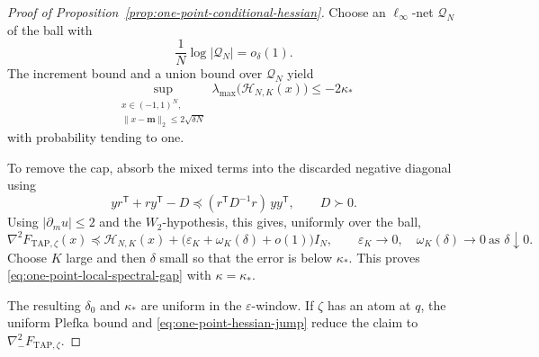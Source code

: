 \documentclass[a4paper,10pt,reqno]{amsart}
\numberwithin{equation}{section}
\newcommand{\ve}{\varepsilon}
\newcommand{\TAP}{\mathrm{TAP}}
\newcommand{\bfm}{\mathbf{m}}
\begin{document}
\begin{proof}[Proof of Proposition~\ref{prop:one-point-conditional-hessian}]
		Choose an \(\ell_\infty\)-net \(\mathcal Q_N\) of the ball with
		\[
		\frac1N\log|\mathcal Q_N|=o_\delta(1).
		\]
		The increment bound and a union bound over \(\mathcal Q_N\) yield
		\[
		\sup_{\substack{
				x\in(-1,1)^N,\\
				\|x-\bfm\|_2\le2\sqrt{\delta N}
		}}
		\lambda_{\max}\bigl(\mathcal H_{N,K}(x)\bigr)
		\le-2\kappa_*
		\]
		with probability tending to one.
		
		To remove the cap, absorb the mixed terms into the discarded negative
		diagonal using
		\[
		yr^{\mathsf T}+ry^{\mathsf T}-D
		\preceq
		(r^{\mathsf T}D^{-1}r)\,yy^{\mathsf T},
		\qquad D\succ0.
		\]
		Using \(|\partial_m u|\le2\) and the \(W_2\)-hypothesis, this gives,
		uniformly over the ball,
		\[
		\nabla^2F_{\TAP,\zeta}(x)
		\preceq
		\mathcal H_{N,K}(x)
		+\bigl(\varepsilon_K+\omega_K(\delta)+o(1)\bigr)I_N,
		\qquad
		\varepsilon_K\longrightarrow0,
		\quad
		\omega_K(\delta)\longrightarrow0
		\ \text{as }\delta\downarrow0.
		\]
		Choose \(K\) large and then \(\delta\) small so that the error is below
		\(\kappa_*\). This proves
		\eqref{eq:one-point-local-spectral-gap} with \(\kappa=\kappa_*\).
		
		The resulting \(\delta_0\) and \(\kappa_*\) are uniform in the
		\(\ve\)-window.
		If \(\zeta\) has an atom at \(q\), the uniform Plefka bound and
		\eqref{eq:one-point-hessian-jump} reduce the claim to
		\(\nabla_-^2F_{\TAP,\zeta}\).
	\end{proof}
	
\end{document}
